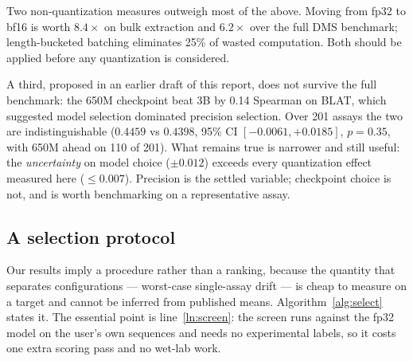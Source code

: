 \documentclass[11pt]{article}
\begin{document}
Two non-quantization measures outweigh most of the above. Moving from fp32 to
bf16 is worth $8.4\times$ on bulk extraction and $6.2\times$ over the full DMS
benchmark; length-bucketed batching eliminates 25\% of wasted computation. Both
should be applied before any quantization is considered.

A third, proposed in an earlier draft of this report, does not survive the full
benchmark: the 650M checkpoint beat 3B by 0.14 Spearman on BLAT, which suggested
model selection dominated precision selection. Over 201 assays the two are
indistinguishable ($0.4459$ vs $0.4398$, 95\% CI $[-0.0061,+0.0185]$,
$p = 0.35$, with 650M ahead on 110 of 201). What remains true is narrower and
still useful: the \emph{uncertainty} on model choice ($\pm 0.012$) exceeds every
quantization effect measured here ($\leq 0.007$). Precision is the settled
variable; checkpoint choice is not, and is worth benchmarking on a
representative assay.

\subsection{A selection protocol}

Our results imply a procedure rather than a ranking, because the quantity that
separates configurations --- worst-case single-assay drift --- is cheap to
measure on a target and cannot be inferred from published means.
Algorithm~\ref{alg:select} states it. The essential point is line~\ref{ln:screen}:
the screen runs against the fp32 model on the user's own sequences and needs no
experimental labels, so it costs one extra scoring pass and no wet-lab work.
\end{document}
